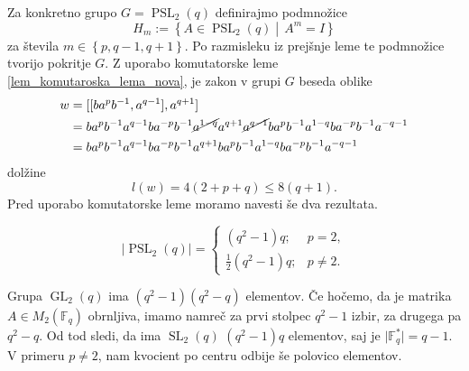     Za konkretno grupo $G = \operatorname{PSL}_2(q)$ definirajmo podmnožice \begin{equation*}
        H_m := \left\{ A \in \operatorname{PSL}_2(q)  \middle|\,  A^{m} = I \right\}
    \end{equation*}  
       za števila $m \in \left\{ p, q-1 , q+1\right\}$.
    Po razmisleku iz prejšnje leme te podmnožice tvorijo pokritje $G$. Z uporabo komutatorske leme \ref{lem_komutaroska_lema_nova}, je zakon v grupi $G$ beseda oblike \begin{align*}
        w &= [[b a^{p} b^{-1}, a^{q-1}], a^{q + 1}]  \\
         &= b a^{p} b^{-1} a^{q-1} b a^{-p} b^{-1} \cancel{ a^{1 - q}} a^{q + 1} \cancel{a^{q -1}} b a^{p} b^{-1} a^{1 - q} b a^{-p} b^{-1} a^{- q - 1} \\ 
         &= b a^{p} b^{-1} a^{q-1} b a^{-p} b^{-1}  a^{q + 1}  b a^{p} b^{-1} a^{1 - q} b a^{-p} b^{-1} a^{- q - 1} 
    \end{align*}  
    dolžine \begin{equation*} 
    l(w) = 4(2 + p + q) \le 8(q + 1). 
    \end{equation*}
    Pred uporabo komutatorske leme moramo navesti še dva rezultata.
    \begin{lema}
    \label{lem_velikost_grupe_psl2q}
    \begin{equation*}
        \lvert \operatorname{PSL}_2(q) \rvert   = \begin{cases}
            (q^2 - 1) q; & p = 2,  \\
            \frac{1}{2} (q^2 - 1) q ; & p \neq 2.
        \end{cases}
     \end{equation*} 
    \end{lema}
    \begin{dokaz}
    Grupa $\operatorname{GL}_2(q)$ ima $(q^2  -1)(q^2 - q)$ elementov. Če hočemo, da je matrika $A \in M_2(\mathbb{F}_q)$ obrnljiva, imamo namreč za prvi stolpec $q^2 -1$ izbir, za drugega pa $q^2 - q$.
    Od tod sledi, da ima $\operatorname{SL}_2(q)$ $(q^2  -1)q$ elementov, saj je $\lvert \mathbb{F}_q^{*} \rvert = q-1$. V primeru $p \neq 2$, nam kvocient po centru odbije še polovico elementov.   
    \end{dokaz}
    
